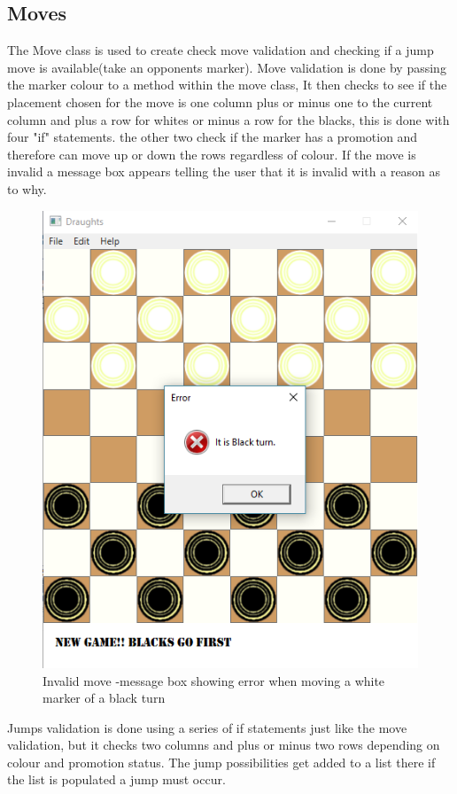 \documentclass[10pt, a4paper]{article}
\begin{document}
	\subsection{Moves}
	The Move class  is used to create check move validation and checking if a jump move is available(take an opponents marker). Move validation is done by passing the marker colour to a method within the move class, It then checks to see if the placement chosen for the move is one column plus or minus one to the current column and plus a row for whites or minus a row for the blacks, this is done with four "if" statements. the other two check if the marker has a promotion and therefore can move up or down the rows regardless of colour. If the move is invalid a message box appears telling the user that it is invalid with a reason as to why.
	\begin{figure}[H]
  	\centering
  	\includegraphics[scale = 0.5]{errors}
	\caption{Invalid move -message box showing error when moving a white marker of a black turn}
  	\label{fig:nonfloat}
	\end{figure}
	
	
Jumps validation is done using a series of if statements just like the move validation, but it checks two columns and plus or minus two rows depending on colour and promotion status. The jump possibilities get added to a list there if the list is populated a jump must occur.  
\end{document}
